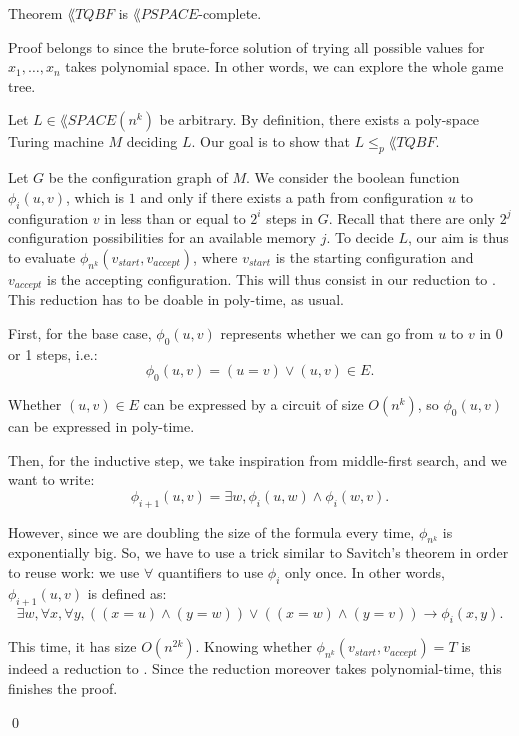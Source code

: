 \documentclass[a4paper]{article}
\begin{document}
\begin{parag}{Theorem}
    $\lang{TQBF}$ is $\lang{PSPACE}$-complete.

    \begin{subparag}{Proof}
         belongs to  since the brute-force solution of trying all possible values for $x_1, \ldots, x_n$ takes polynomial space. In other words, we can explore the whole game tree.

        Let $L \in \lang{SPACE}\left(n^k\right)$ be arbitrary. By definition, there exists a poly-space Turing machine $M$ deciding $L$. Our goal is to show that $L \leq_p \lang{TQBF}$.

        Let $G$ be the configuration graph of $M$. We consider the boolean function $\phi_i\left(u, v\right)$, which is $1$ and only if there exists a path from configuration $u$ to configuration $v$ in less than or equal to $2^{i}$ steps in $G$. Recall that there are only $2^j$ configuration possibilities for an available memory $j$. To decide $L$, our aim is thus to evaluate $\phi_{n^k}\left(v_{start}, v_{accept}\right)$, where $v_{start}$ is the starting configuration and $v_{accept}$ is the accepting configuration. This will thus consist in our reduction to . This reduction has to be doable in poly-time, as usual.

        First, for the base case, $\phi_0\left(u, v\right)$ represents whether we can go from $u$ to $v$ in 0 or 1 steps, i.e.:
        \[\phi_0\left(u, v\right) = \left(u = v\right) \lor \left(u, v\right) \in E.\]

        Whether $\left(u, v\right) \in E$ can be expressed by a circuit of size $O\left(n^k\right)$, so $\phi_0\left(u, v\right)$ can be expressed in poly-time.

        Then, for the inductive step, we take inspiration from middle-first search, and we want to write: 
        \[\phi_{i+1}\left(u, v\right) = \exists w, \phi_i\left(u, w\right) \land \phi_i\left(w, v\right).\]

        However, since we are doubling the size of the formula every time, $\phi_{n^k}$ is exponentially big. So, we have to use a trick similar to Savitch's theorem in order to reuse work: we use $\forall$ quantifiers to use $\phi_i$ only once. In other words, $\phi_{i+1}\left(u, v\right)$ is defined as: 
        \[\exists w, \forall x, \forall y, \left(\left(x = u\right) \land \left(y = w\right)\right) \lor \left(\left(x = w\right) \land \left(y=v\right)\right) \to \phi_i\left(x, y\right).\]

        This time, it has size $O\left(n^{2k}\right)$. Knowing whether $\phi_{n^k}\left(v_{start}, v_{accept}\right) = T$ is indeed a reduction to . Since the reduction moreover takes polynomial-time, this finishes the proof.

        \qed
    \end{subparag}
\end{parag}
\end{document}
